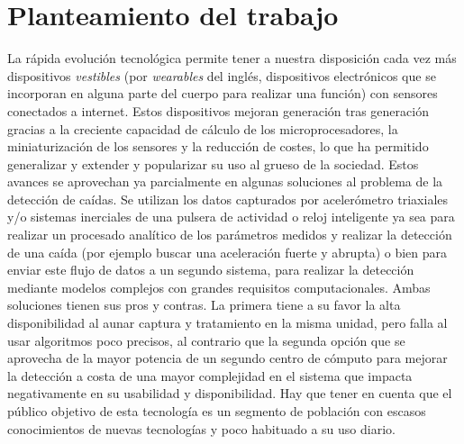 \section{Planteamiento del trabajo}

\begin{comment}
¿cómo se puede resolver el problema qué se propone descripción de objetivos en términos generales?
\end{comment}

La rápida evolución tecnológica permite tener a nuestra disposición cada vez más dispositivos \textit{vestibles} (por \textit{wearables} del inglés, dispositivos electrónicos que se incorporan en alguna parte del cuerpo para realizar una función) con sensores conectados a internet. Estos dispositivos mejoran generación tras generación gracias a la creciente capacidad de cálculo de los microprocesadores, la miniaturización de los sensores y la reducción de costes, lo que ha permitido generalizar y extender y popularizar su uso al grueso de la sociedad. Estos avances se aprovechan ya parcialmente en algunas soluciones al problema de la detección de caídas. Se utilizan los datos capturados por acelerómetro triaxiales y/o sistemas inerciales de una pulsera de actividad o reloj inteligente ya sea para realizar un procesado analítico de los parámetros medidos y realizar la detección de una caída \cite{fallindex00, Chen2005,Bourke2006,Kangas2008,Bagala2012} (por ejemplo buscar una aceleración fuerte y abrupta) o bien para enviar este flujo de datos a un segundo sistema\cite{Luque2014,Vilarinho2015}, para realizar la detección mediante modelos complejos con grandes requisitos computacionales\cite{Cho2014, Aziz2017b,Putra2017}. Ambas soluciones tienen sus pros y contras. La primera tiene a su favor la alta disponibilidad al aunar captura y tratamiento en la misma unidad, pero falla al usar algoritmos poco precisos, al contrario que la segunda opción que se aprovecha de la mayor potencia de un segundo centro de cómputo para mejorar la detección a costa de una mayor complejidad en el sistema que impacta negativamente en su usabilidad y disponibilidad. Hay que tener en cuenta que el público objetivo de esta tecnología es un segmento de población con escasos conocimientos de nuevas tecnologías y poco habituado a su uso diario.

